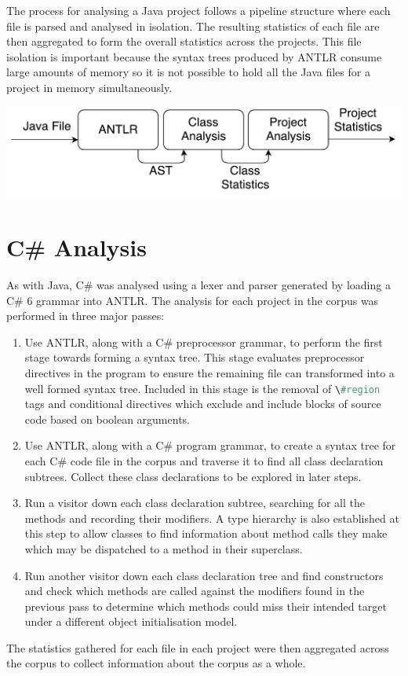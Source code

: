 \documentclass[11pt
              , a4paper
              , twoside
              , openright
              ]{report}
\newcommand{\cs}[1]{\lstinline[language=cs]{#1}}
\providecommand{\DIFadd}[1]{{\protect\color{blue}\uwave{#1}}} %
\providecommand{\DIFaddbegin}{} %
\providecommand{\DIFaddend}{} %
\begin{document}
The process for analysing a Java project follows a pipeline structure where each file is parsed and analysed in isolation. The resulting statistics of each file are then aggregated to form the overall statistics across the projects. This file isolation is important because the syntax trees produced by ANTLR consume large amounts of memory so it is not possible to hold all the Java files for a project in memory simultaneously.
\newline

\begin{center}
	\includegraphics[scale=0.70]{AntlrPipeline.pdf}
\end{center}

\section{C\# Analysis}
As with Java, C\# was analysed using a lexer and parser generated by loading a C\# 6 grammar into ANTLR. The analysis for each project in the corpus was performed in three major passes:
\begin{enumerate}
	\item Use ANTLR, along with a C\# preprocessor grammar, to perform the first stage towards forming a syntax tree. This stage evaluates preprocessor directives in the program to ensure the remaining file can \DIFaddbegin \DIFadd{be }\DIFaddend transformed into a well formed syntax tree. Included in this stage is the removal of \cs{\#region} tags and conditional directives which exclude and include blocks of source code based on boolean arguments.
	\item Use ANTLR, along with a C\# program grammar, to create a syntax tree for each C\# code file in the corpus and traverse it to find all class declaration subtrees. Collect these class declarations to be explored in later steps.
	\item Run a visitor down each class declaration subtree, searching for all the methods and recording their modifiers. A type hierarchy is also established at this step to allow classes to find information about method calls they make which may be dispatched to a method in their superclass.
	\item Run another visitor down each class declaration tree and find constructors and check which methods are called against the modifiers found in the previous pass to determine which methods could miss their intended target under a different object initialisation model.
\end{enumerate}
The statistics gathered for each file in each project were then aggregated across the corpus to collect information about the corpus as a whole.
\end{document}
